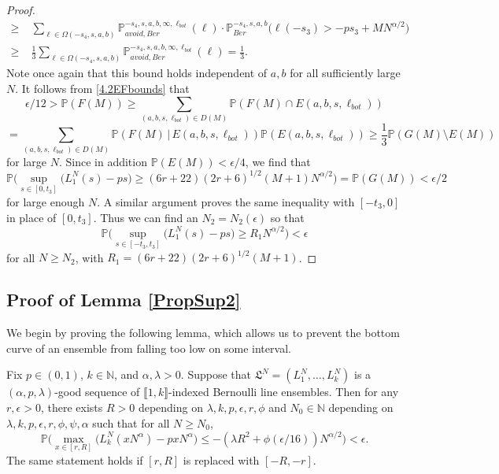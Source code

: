 \begin{proof}
\begin{align*}
	\geq \; & \sum_{\ell\in\Omega(-s_4,s,a,b)} \mathbb{P}^{-s_4,s,a,b,\infty,\ell_{bot}}_{avoid, Ber}(\ell)\cdot \mathbb{P}^{-s_4,s,a,b}_{Ber}\big(\ell(-s_3) > -ps_3 + MN^{\alpha/2}\big)\\
	\geq \; & \frac{1}{3}\sum_{\ell\in\Omega(-s_4,s,a,b)} \mathbb{P}^{-s_4,s,a,b,\infty,\ell_{bot}}_{avoid, Ber}(\ell) = \frac{1}{3}.
	\end{align*}
	Note once again that this bound holds independent of $a,b$ for all sufficiently large $N$. It follows from \eqref{4.2EFbounds} that
	\[
	\epsilon/12 > \mathbb{P}(F(M)) \geq \sum_{(a,b,s,\ell_{bot})\in D(M)} \mathbb{P}(F(M)\cap E(a,b,s,\ell_{bot}))
	\]
	\[
	= \sum_{(a,b,s,\ell_{bot})\in D(M)} \mathbb{P}(F(M)\,|\, E(a,b,s,\ell_{bot}))\mathbb{P}(E(a,b,s,\ell_{bot})) \geq \frac{1}{3}\mathbb{P}(G(M)\setminus E(M))
	\]
	for large $N$. Since in addition $\mathbb{P}(E(M)) < \epsilon/4$, we find that
	\[
	\mathbb{P}\Big( \sup_{s \in [0,t_3] }\big( L^N_1(s) - p s \big) \geq  (6r+22)(2r+6)^{1/2}(M+1)N^{\alpha/2} \Big) = \mathbb{P}(G(M)) < \epsilon/2
	\]
	for large enough $N$. A similar argument proves the same inequality with $[-t_3,0]$ in place of $[0,t_3]$. Thus we can find an $N_2 = N_2(\epsilon)$ so that
	\[
	\mathbb{P}\Big( \sup_{s \in [-t_3,t_3] }\big( L^N_1(s) - p s \big) \geq  R_1N^{\alpha/2} \Big) < \epsilon
	\]
	for all $N\geq N_2$, with $R_1 = (6r+22)(2r+6)^{1/2}(M+1)$.
	
\end{proof}
	
	
\subsection{Proof of Lemma \ref{PropSup2}}

	We begin by proving the following lemma, which allows us to prevent the bottom curve of an ensemble from falling too low on some interval.
	
	\begin{lemma}\label{21}
		Fix $p\in (0,1)$, $k\in\mathbb{N}$, and $\alpha,\lambda > 0$. Suppose that $\mathfrak{L}^N = (L_1^N, \dots, L_k^N)$ is a $(\alpha,p,\lambda)$-good sequence of $\llbracket 1, k\rrbracket$-indexed Bernoulli line ensembles. Then for any $r,\epsilon>0$, there exists $R>0$ depending on $\lambda,k,p,\epsilon,r,\phi$ and $N_0 \in \mathbb{N}$ depending on $\lambda,k,p,\epsilon,r,\phi,\psi,\alpha$ such that for all $N\geq N_0$,
		\[
		\mathbb{P}\Big(\max_{x\in[r,R]} \big(L_k^N(xN^\alpha) - pxN^\alpha\big) \leq -(\lambda R^2 + \phi(\epsilon/16))N^{\alpha/2}\Big) < \epsilon.
		\]
		The same statement holds if $[r,R]$ is replaced with $[-R,-r]$.
	\end{lemma}

